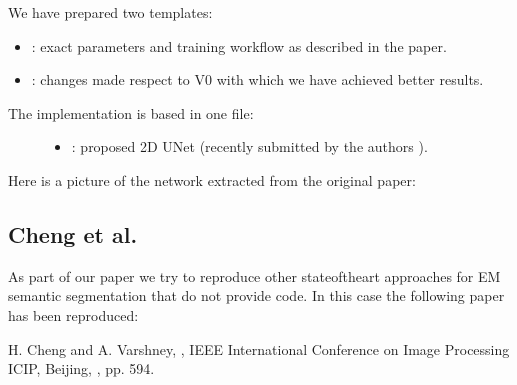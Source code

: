 \documentclass[letterpaper,10pt,english]{sphinxmanual}
\begin{document}
We have prepared two templates:
\begin{itemize}
\item {} 
 : exact parameters and training workflow as described in the paper.

\item {} 
 : changes made respect to V0 with which we have achieved better results.

\end{itemize}
\begin{description}
\item[{The implementation is based in one file:}] \leavevmode\begin{itemize}
\item {} 
: proposed 2D U\sphinxhyphen{}Net (recently submitted by the authors ).

\end{itemize}

\end{description}

Here is a picture of the network extracted from the original paper:



\subsection{Cheng et al.}
\label{\detokenize{sota_implementations/cheng_2017/cheng:cheng-et-al}}\label{\detokenize{sota_implementations/cheng_2017/cheng::doc}}
As part of our paper we try to reproduce other state\sphinxhyphen{}of\sphinxhyphen{}the\sphinxhyphen{}art approaches for EM semantic segmentation
that do not provide code. In this case the following paper has been reproduced:

\begin{sphinxVerbatim}[commandchars=\\\{\}]
H. Cheng and A. Varshney, 
,  IEEE International Conference on Image Processing ICIP,
Beijing, , pp. \PYGZhy{}594.
\end{sphinxVerbatim}
\end{document}

